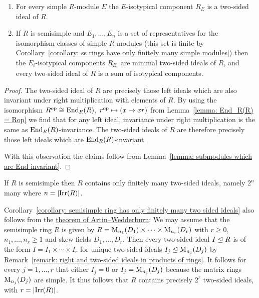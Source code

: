 \begin{corollary}
  \label{corollary: isotypical components as two sided ideals}
  \leavevmode
  \begin{enumerate}
    \item
      For every simple $R$-module $E$ the $E$-isotypical component $R_E$ is a two-sided ideal of $R$.
    \item
      If $R$ is semisimple and $E_1, \dotsc, E_n$ is a set of representatives for the isomorphism classes of simple $R$-modules (this set is finite by Corollary~\ref{corollary: ss rings have only finitely many simple modules}) then the $E_i$-isotypical components $R_{E_i}$ are minimal two-sided ideals of $R$, and every two-sided ideal of $R$ is a sum of isotypical components.
  \end{enumerate}
\end{corollary}


\begin{proof}
    The two-sided ideal of $R$ are precisely those left ideals which are also invariant under right multiplication with elements of $R$.
    By using the isomorphism $R^{\operatorname{op}} \cong \operatorname{End}_R(R)$, $r^{\operatorname{op}} \mapsto (x \mapsto xr)$ from Lemma~\ref{lemma: End_R(R) = Rop} we find that for any left ideal, invariance under right multiplication is the same as $\operatorname{End}_R(R)$-invariance.
    The two-sided ideals of $R$ are therefore precisely those left ideals which are $\operatorname{End}_R(R)$-invariant.
    
    With this observation the claims follow from Lemma~\ref{lemma: submodules which are End invariant}.
\end{proof}


\begin{corollary}
  \label{corollary: semisimple ring has only finitely many two sided ideals}
  If $R$ is semisimple then $R$ contains only finitely many two-sided ideals, namely $2^n$ many where $n = |{\operatorname{Irr}(R)}|$.
\end{corollary}


\begin{remark}
  Corollary~\ref{corollary: semisimple ring has only finitely many two sided ideals} also follows from the \hyperref[theorem: artin wedderburn theorem]{theorem of Artin--Wedderburn}:
  We may assume that the semisimple ring $R$ is given by $R = \operatorname{M}_{n_1}(D_1) \times \dotsb \times \operatorname{M}_{n_r}(D_r)$ with $r \geq 0$, $n_1, \dotsc, n_r \geq 1$ and skew fields $D_1, \dotsc, D_r$.
  Then every two-sided ideal $I \trianglelefteq R$ is of the form $I = I_1 \times \dotsb \times I_r$ for unique two-sided ideals $I_j \trianglelefteq \operatorname{M}_{n_j}(D_j)$ by Remark~\ref{remark: right and two-sided ideals in products of rings}.
  It follows for every $j = 1, \dotsc, r$ that either $I_j = 0$ or $I_j = \operatorname{M}_{n_j}(D_j)$ because the matrix rings $\operatorname{M}_{n_j}(D_j)$ are simple.
  It thus follows that $R$ contains precisely $2^r$ two-sided ideals, with $r = |{\operatorname{Irr}(R)}|$.
\end{remark}



